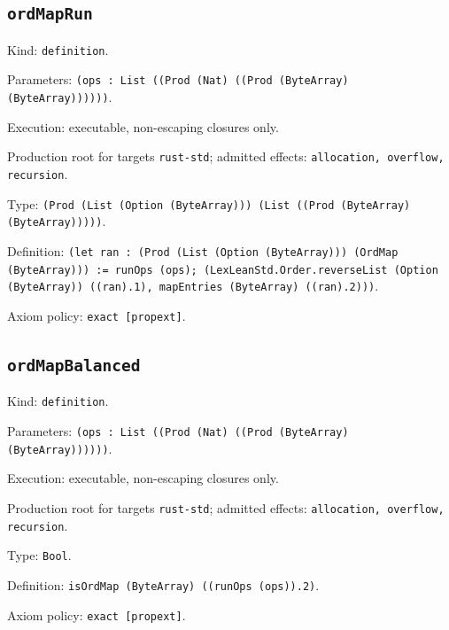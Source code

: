 \documentclass[11pt]{article}
\begin{document}
\subsection*{\texttt{ordMapRun}}
\noindent Kind: \texttt{definition}.\par
\noindent Parameters: \texttt{(ops : List ((Prod (Nat) ((Prod (ByteArray) (ByteArray))))))}.\par
\noindent Execution: executable, non-escaping closures only.\par
\noindent Production root for targets \texttt{rust-std}; admitted effects: \texttt{allocation, overflow, recursion}.\par
\noindent Type: \texttt{(Prod (List (Option (ByteArray))) (List ((Prod (ByteArray) (ByteArray)))))}.\par
\noindent Definition: \texttt{(let ran : (Prod (List (Option (ByteArray))) (OrdMap (ByteArray))) := runOps (ops); (LexLeanStd.Order.reverseList (Option (ByteArray)) ((ran).1), mapEntries (ByteArray) ((ran).2)))}.\par
\noindent Axiom policy: \texttt{exact [propext]}.\par
\subsection*{\texttt{ordMapBalanced}}
\noindent Kind: \texttt{definition}.\par
\noindent Parameters: \texttt{(ops : List ((Prod (Nat) ((Prod (ByteArray) (ByteArray))))))}.\par
\noindent Execution: executable, non-escaping closures only.\par
\noindent Production root for targets \texttt{rust-std}; admitted effects: \texttt{allocation, overflow, recursion}.\par
\noindent Type: \texttt{Bool}.\par
\noindent Definition: \texttt{isOrdMap (ByteArray) ((runOps (ops)).2)}.\par
\noindent Axiom policy: \texttt{exact [propext]}.\par
\end{document}
